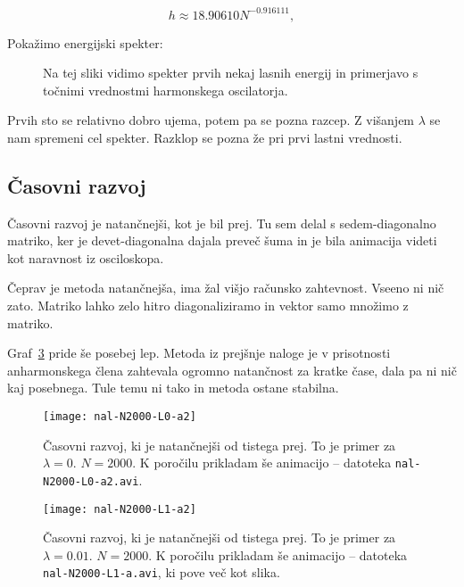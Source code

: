 \documentclass[a4 paper, 12pt]{article}
\begin{document}
\[
	h \approx 18.90610 N^{-0.916111},
\]

Pokažimo energijski spekter:

\begin{figure}[H]
	\begin{center}
		
	\end{center}
	\vspace{-20pt}
	\caption{Na tej sliki vidimo spekter prvih nekaj lasnih energij in primerjavo s točnimi vrednostmi
		harmonskega oscilatorja.}
	\label{Energije}
	\vspace{-10pt}
\end{figure}

Prvih sto se relativno dobro ujema, potem pa se pozna razcep. Z višanjem $\lambda$ se nam spremeni cel spekter. Razklop
se pozna že pri prvi lastni vrednosti.

\subsection{Časovni razvoj}

Časovni razvoj je natančnejši, kot je bil prej. Tu sem delal s sedem-diagonalno matriko, ker je devet-diagonalna dajala
preveč šuma in je bila animacija videti kot naravnost iz osciloskopa.

Čeprav je metoda natančnejša, ima žal višjo računsko zahtevnost. Vseeno ni nič zato. Matriko lahko zelo hitro diagonaliziramo
in vektor samo množimo z matriko.

Graf~\ref{časovni1} pride še posebej lep. Metoda iz prejšnje naloge je v prisotnosti anharmonskega člena zahtevala ogromno
natančnost za kratke čase, dala pa ni nič kaj posebnega. Tule temu ni tako in metoda ostane stabilna.

\begin{figure}[H]
	\centering
	\texttt{[image: nal-N2000-L0-a2]}
	\vspace{-20pt}
	\caption{Časovni razvoj, ki je natančnejši od tistega prej. To je primer za $\lambda = 0$. $N = 2000$.
		K poročilu prikladam še animacijo -- datoteka {\tt nal-N2000-L0-a2.avi}.}
	\label{časovni0}
\end{figure}
\begin{figure}[H]
	\centering
	\texttt{[image: nal-N2000-L1-a2]}
	\vspace{-20pt}
	\caption{Časovni razvoj, ki je natančnejši od tistega prej. To je primer za $\lambda = 0.01$. $N = 2000$.
		K poročilu prikladam še animacijo -- datoteka {\tt nal-N2000-L1-a.avi}, ki pove več kot slika.}
	\label{časovni1}
\end{figure}
\end{document}
